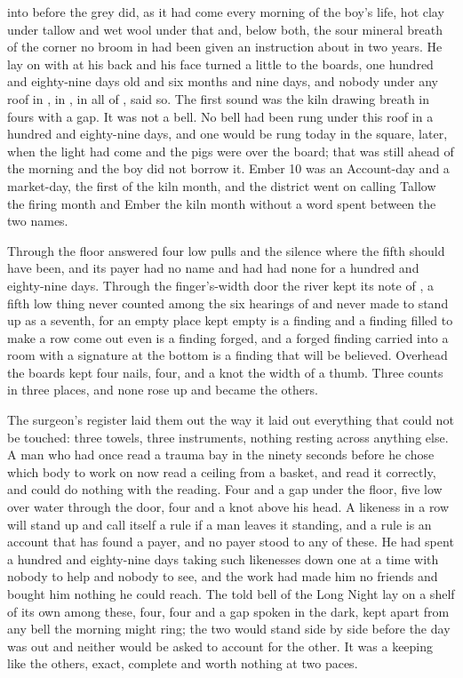 
 into  before the grey did, as it had come every morning of the boy's life, hot clay under tallow and wet wool under that and, below both, the sour mineral breath of the corner no broom in  had been given an instruction about in two years. He lay on  with  at his back and his face turned a little to the boards, one hundred and eighty-nine days old and six months and nine days, and nobody under any roof in , in , in all of , said so. The first sound was the kiln drawing breath in fours with a gap. It was not a bell. No bell had been rung under this roof in a hundred and eighty-nine days, and one would be rung today in the square, later, when the light had come and the pigs were over the board; that was still ahead of the morning and the boy did not borrow it. Ember 10 was an Account-day and a market-day, the first of the kiln month, and the district went on calling Tallow the firing month and Ember the kiln month without a word spent between the two names.

Through the floor  answered four low pulls and the silence where the fifth should have been, and its payer had no name and had had none for a hundred and eighty-nine days. Through the finger's-width door the river kept its note of , a fifth low thing never counted among the six hearings of  and never made to stand up as a seventh, for an empty place kept empty is a finding and a finding filled to make a row come out even is a finding forged, and a forged finding carried into a room with a signature at the bottom is a finding that will be believed. Overhead the boards kept four nails, four, and a knot the width of a thumb. Three counts in three places, and none rose up and became the others.

The surgeon's register laid them out the way it laid out everything that could not be touched: three towels, three instruments, nothing resting across anything else. A man who had once read a trauma bay in the ninety seconds before he chose which body to work on now read a ceiling from a basket, and read it correctly, and could do nothing with the reading. Four and a gap under the floor, five low over water through the door, four and a knot above his head. A likeness in a row will stand up and call itself a rule if a man leaves it standing, and a rule is an account that has found a payer, and no payer stood to any of these. He had spent a hundred and eighty-nine days taking such likenesses down one at a time with nobody to help and nobody to see, and the work had made him no friends and bought him nothing he could reach. The told bell of the Long Night lay on a shelf of its own among these, four, four and a gap spoken in the dark, kept apart from any bell the morning might ring; the two would stand side by side before the day was out and neither would be asked to account for the other. It was a keeping like the others, exact, complete and worth nothing at two paces.

